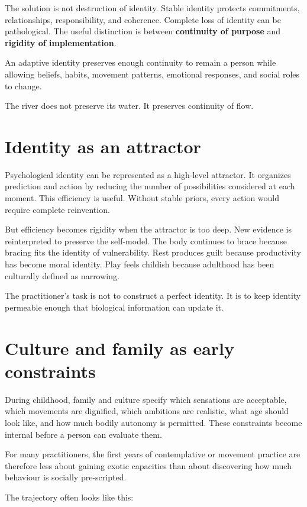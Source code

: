 The solution is not destruction of identity. Stable identity protects commitments, relationships, responsibility, and coherence. Complete loss of identity can be pathological. The useful distinction is between \textbf{continuity of purpose} and \textbf{rigidity of implementation}.

An adaptive identity preserves enough continuity to remain a person while allowing beliefs, habits, movement patterns, emotional responses, and social roles to change.

The river does not preserve its water. It preserves continuity of flow.

\section{Identity as an attractor}

Psychological identity can be represented as a high-level attractor. It organizes prediction and action by reducing the number of possibilities considered at each moment. This efficiency is useful. Without stable priors, every action would require complete reinvention.

But efficiency becomes rigidity when the attractor is too deep. New evidence is reinterpreted to preserve the self-model. The body continues to brace because bracing fits the identity of vulnerability. Rest produces guilt because productivity has become moral identity. Play feels childish because adulthood has been culturally defined as narrowing.

The practitioner's task is not to construct a perfect identity. It is to keep identity permeable enough that biological information can update it.

\section{Culture and family as early constraints}

During childhood, family and culture specify which sensations are acceptable, which movements are dignified, which ambitions are realistic, what age should look like, and how much bodily autonomy is permitted. These constraints become internal before a person can evaluate them.

For many practitioners, the first years of contemplative or movement practice are therefore less about gaining exotic capacities than about discovering how much behaviour is socially pre-scripted.

The trajectory often looks like this:

